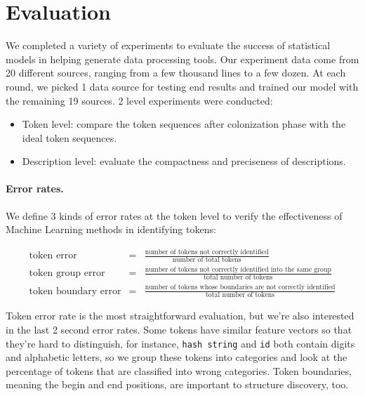 \section{Evaluation}\label{sec:eval}

We completed a variety of experiments to evaluate the success of
statistical models in helping \learnpads{} generate data processing
tools. Our experiment data come from 20 different sources, ranging
from a few thousand lines to a few dozen. At each round, we picked 1
data source for testing end results and trained our model with the
remaining 19 sources. 2 level experiments were conducted:

\begin{itemize}
\item Token level: compare the token sequences after colonization
phase with the ideal token sequences.
\item Description level: evaluate the compactness and preciseness
of descriptions.
\end{itemize}

\paragraph*{Error rates.}

We define 3 kinds of error rates at the token level to verify the
effectiveness of Machine Learning methods in identifying tokens:

\begin{eqnarray*}
\textrm{token error} & = & \frac{\textrm{number of tokens not
correctly
identified}}{\textrm{number of total tokens}} \\
\textrm{token group error} & = & \frac{\textrm{number of tokens not
correctly
identified into the same group}}{\textrm{total number of tokens}}\\
\textrm{token boundary error} & = & \frac{\textrm{number of tokens
whose boundaries are not correctly identified}}{\textrm{total number
of tokens}}
\end{eqnarray*}

Token error rate is the most straightforward evaluation, but we're
also interested in the last 2 second error rates. Some tokens have
similar feature vectors so that they're hard to distinguish, for
instance, {\tt hash string} and {\tt id} both contain digits and
alphabetic letters, so we group these tokens into categories and
look at the percentage of tokens that are classified into wrong
categories. Token boundaries, meaning the begin and end positions,
are important to structure discovery, too.

